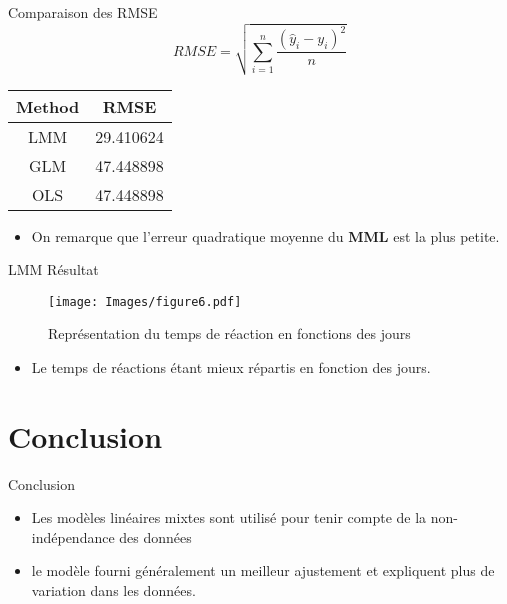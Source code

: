 \documentclass[unknownkeysallowed]{beamer}
\begin{document}
\begin{frame}{Comparaison des RMSE}
$$ RMSE=\sqrt{\sum_{i=1}^{n} \frac{\left(\hat{y}_{i}-y_{i}\right)^{2}}{n}} $$

\begin{center}
\begin{tabular}{ c c }
\hline
Method & RMSE\\
\hline
LMM	& 29.410624\\
GLM	& 47.448898\\
OLS	& 47.448898\\
\hline
\end{tabular}
\end{center}

\begin{itemize}
    \item On remarque que l'erreur quadratique moyenne du \textbf{MML} est la plus petite.
\end{itemize}
\end{frame}



\begin{frame}{LMM Résultat}
     \begin{figure}[H]
    \centering
    \texttt{[image: Images/figure6.pdf]}
    \caption{Représentation du temps de réaction en fonctions des jours}
    \end{figure}
\begin{itemize}
    \item Le temps de réactions étant mieux répartis en fonction des jours.
\end{itemize}
\end{frame}

\section{Conclusion}
\begin{frame}{Conclusion}
\begin{itemize}
    \item Les modèles linéaires mixtes sont utilisé pour tenir compte de la non-indépendance des données
    \item le modèle fourni généralement un meilleur ajustement et expliquent plus de variation dans les données.
\newpage
    
\end{itemize}
\end{frame}
\end{document}
